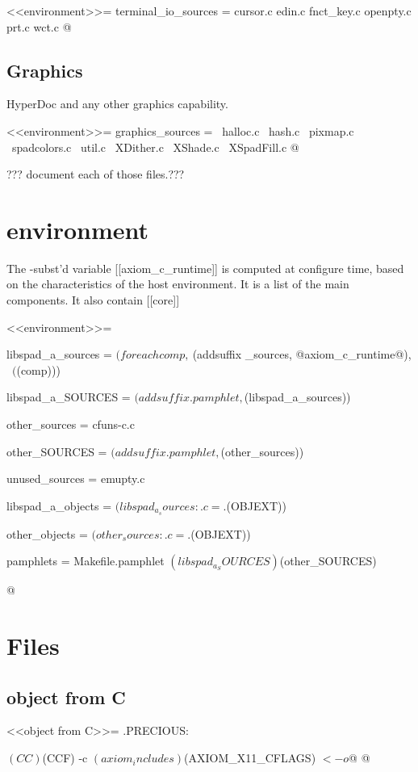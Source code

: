 \documentclass{article}
\begin{document}
<<environment>>=
terminal_io_sources = cursor.c edin.c fnct_key.c openpty.c prt.c wct.c
@


\subsection{Graphics}

HyperDoc and any other graphics capability.

<<environment>>=
graphics_sources = \
		halloc.c \
		hash.c \
		pixmap.c \
		spadcolors.c \
		util.c \
		XDither.c \
		XShade.c \
		XSpadFill.c
@

??? document each of those files.???


\section{environment}

The -subst'd variable [[axiom_c_runtime]] is computed
at configure time, based on the characteristics of the host environment.
It is a list of the main components.  It also contain [[core]]

<<environment>>=

libspad_a_sources = $(foreach comp, \
			$(addsuffix _sources, @axiom_c_runtime@), \
			$($(comp)))

libspad_a_SOURCES = $(addsuffix .pamphlet,$(libspad_a_sources))

other_sources = cfuns-c.c

other_SOURCES = $(addsuffix .pamphlet,$(other_sources))

unused_sources = emupty.c

libspad_a_objects = $(libspad_a_sources:.c=.$(OBJEXT))

other_objects = $(other_sources:.c=.$(OBJEXT))

pamphlets = Makefile.pamphlet $(libspad_a_SOURCES) $(other_SOURCES)

@

\section{Files}

\subsection{object from C}
<<object from C>>=
.PRECIOUS: %

	$(CC) $(CCF) -c $(axiom_includes) $(AXIOM_X11_CFLAGS) $< -o $@
@
\end{document}
